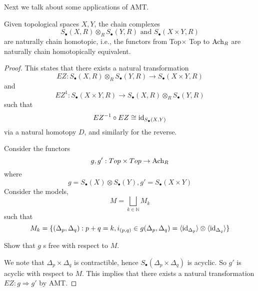 Next we talk about some applications of AMT.
\begin{thm}
    Given topological spaces $X,Y$, the chain complexes 
    \begin{equation*}
        S_\bullet(X,R)\otimes_R S_\bullet(Y,R) \text{ and } S_\bullet(X\times Y,R)
    \end{equation*}
    are naturally chain homotopic, i.e., the functors from Top$\times$ Top to $\text{Ach}_R$ are naturally chain homotopically equivalent.
\end{thm}
\begin{proof}
    This states that there exists a natural transformation 
    \begin{equation*}
        EZ: S_\bullet(X,R)\otimes_R S_\bullet(Y,R)\to S_\bullet(X\times Y,R)
    \end{equation*}
    and 
    \begin{equation*}
        EZ^{1}:S_\bullet(X\times Y,R)\to S_\bullet(X,R)\otimes_R S_\bullet(Y,R)
    \end{equation*}
    such that 
    \begin{equation*}
        EZ^{-1}\circ EZ\cong \text{id}_{S_\bullet(X,Y)}
    \end{equation*}
    via a natural homotopy $D$, and similarly for the reverse.

    Consider the functors 
    \begin{equation*}
        g,g':Top\times Top\to\text{Ach}_R
    \end{equation*}
    where 
    \begin{equation*}
        g=S_\bullet(X)\otimes S_\bullet(Y), g'=S_\bullet(X\times Y)
    \end{equation*}
    Consider the models,
    \begin{equation*}
        M=\bigsqcup_{k\in\mathbb{N}}M_k
    \end{equation*}
    such that 
    \begin{equation*}
        M_k=\{(\Delta_p,\Delta_q): p+q=k, i_{(p,q)}\in g(\Delta_p,\Delta_q)=\langle\text{id}_{\Delta_p}\rangle\otimes\langle\text{id}_{\Delta_q}\rangle\}
    \end{equation*}
    \begin{prob}[HW(3.1)]
        Show that $g$ s free with respect to $M$.
    \end{prob}
    We note that $\Delta_p\times\Delta_q$ is contractible, hence $S_\bullet(\Delta_p\times\Delta_q)$ is acyclic. So $g'$ is acyclic with respect to $M$. This implies that there exists a natural transformation $EZ:g\Rightarrow g'$ by AMT.
    

\end{proof}
